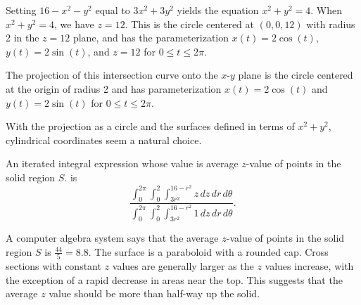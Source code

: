 \begin{exercises}
\begin{exerciseSolution}
		\ba
			\item Setting $16-x^2-y^2$ equal to $3x^2+3y^2$ yields the equation $x^2+y^2=4$. When $x^2+y^2=4$, we have $z = 12$. This is the circle centered at $(0,0,12)$ with radius 2 in the $z=12$ plane, and has the parameterization $x(t) = 2\cos(t)$, $y(t) = 2\sin(t)$, and $z=12$ for $0 \leq t \leq 2\pi$. 
			\item The projection of this intersection curve onto the $x$-$y$ plane is the circle centered at the origin of radius 2 and has parameterization $x(t) = 2\cos(t)$ and $y(t) = 2\sin(t)$ for $0 \leq t \leq 2\pi$. 
			\item With the projection as a circle and the surfaces defined in terms of $x^2+y^2$, cylindrical coordinates seem a natural choice. 
			\item An iterated integral expression whose value is average $z$-value of points in the solid region $S$. is
\[\frac{\int_{0}^{2\pi} \int_{0}^{2} \int_{3r^2}^{16-r^2} z \, dz \, dr \, d\theta}{\int_{0}^{2\pi} \int_{0}^{2} \int_{3r^2}^{16-r^2} 1 \, dz \, dr \, d\theta}.\]
			\item A computer algebra system says that the average $z$-value of points in the solid region $S$ is $\frac{44}{5} = 8.8$. The surface is a paraboloid with a rounded cap. Cross sections with constant $z$ values are generally larger as the $z$ values increase, with the exception of a rapid decrease in areas near the top. This suggests that the average $z$ value should be more than half-way up the solid. 
		\ea
\end{exerciseSolution}


\end{exercises}
\afterexercises
